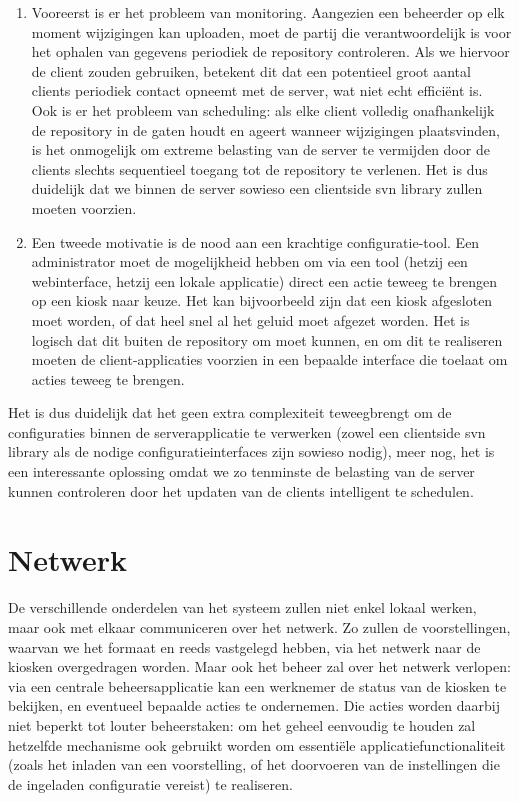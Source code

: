 \begin{enumerate}
\item Vooreerst is er het probleem van monitoring. Aangezien een beheerder op elk moment wijzigingen kan uploaden, moet de partij die verantwoordelijk is voor het ophalen van gegevens periodiek de repository controleren. Als we hiervoor de client zouden gebruiken, betekent dit dat een potentieel groot aantal clients periodiek contact opneemt met de server, wat niet echt efficiënt is. Ook is er het probleem van scheduling: als elke client volledig onafhankelijk de repository in de gaten houdt en ageert wanneer wijzigingen plaatsvinden, is het onmogelijk om extreme belasting van de server te vermijden door de clients slechts sequentieel toegang tot de repository te verlenen. Het is dus duidelijk dat we binnen de server sowieso een clientside \ac{svn} library zullen moeten voorzien.
\item Een tweede motivatie is de nood aan een krachtige configuratie-tool. Een administrator moet de mogelijkheid hebben om via een tool (hetzij een webinterface, hetzij een lokale applicatie) direct een actie teweeg te brengen op een kiosk naar keuze. Het kan bijvoorbeeld zijn dat een kiosk afgesloten moet worden, of dat heel snel al het geluid moet afgezet worden. Het is logisch dat dit buiten de repository om moet kunnen, en om dit te realiseren moeten de client-applicaties voorzien in een bepaalde interface die toelaat om acties teweeg te brengen.
\end{enumerate}

Het is dus duidelijk dat het geen extra complexiteit teweegbrengt om de configuraties binnen de serverapplicatie te verwerken (zowel een clientside \ac{svn} library als de nodige configuratieinterfaces zijn sowieso nodig), meer nog, het is een interessante oplossing omdat we zo tenminste de belasting van de server kunnen controleren door het updaten van de clients intelligent te schedulen.

\section{Netwerk}
\label{ontwerp:applicatie:netwerk}

De verschillende onderdelen van het systeem zullen niet enkel lokaal werken, maar ook met elkaar communiceren over het netwerk. Zo zullen de voorstellingen, waarvan we het formaat en reeds vastgelegd hebben, via het netwerk naar de kiosken overgedragen worden. Maar ook het beheer zal over het netwerk verlopen: via een centrale beheersapplicatie kan een werknemer de status van de kiosken te bekijken, en eventueel bepaalde acties te ondernemen. Die acties worden daarbij niet beperkt tot louter beheerstaken: om het geheel eenvoudig te houden zal hetzelfde mechanisme ook gebruikt worden om essentiële applicatiefunctionaliteit (zoals het inladen van een voorstelling, of het doorvoeren van de instellingen die de ingeladen configuratie vereist) te realiseren.

